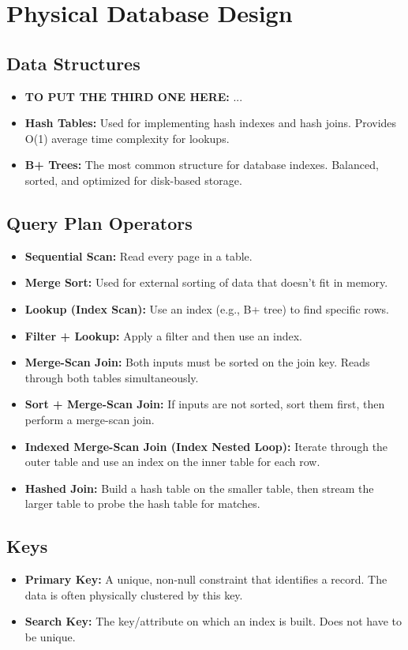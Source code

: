 
\section*{Physical Database Design}

\subsection*{Data Structures}
\begin{itemize}
    \item \textbf{TO PUT THE THIRD ONE HERE:} ...
    \item \textbf{Hash Tables:} Used for implementing hash indexes and hash joins. Provides O(1) average time complexity for lookups.
    \item \textbf{B+ Trees:} The most common structure for database indexes. Balanced, sorted, and optimized for disk-based storage.
\end{itemize}

\subsection*{Query Plan Operators}
\begin{itemize}
    \item \textbf{Sequential Scan:} Read every page in a table.
    \item \textbf{Merge Sort:} Used for external sorting of data that doesn't fit in memory.
    \item \textbf{Lookup (Index Scan):} Use an index (e.g., B+ tree) to find specific rows.
    \item \textbf{Filter + Lookup:} Apply a filter and then use an index.
    \item \textbf{Merge-Scan Join:} Both inputs must be sorted on the join key. Reads through both tables simultaneously.
    \item \textbf{Sort + Merge-Scan Join:} If inputs are not sorted, sort them first, then perform a merge-scan join.
    \item \textbf{Indexed Merge-Scan Join (Index Nested Loop):} Iterate through the outer table and use an index on the inner table for each row.
    \item \textbf{Hashed Join:} Build a hash table on the smaller table, then stream the larger table to probe the hash table for matches.
\end{itemize}

\subsection*{Keys}
\begin{itemize}
    \item \textbf{Primary Key:} A unique, non-null constraint that identifies a record. The data is often physically clustered by this key.
    \item \textbf{Search Key:} The key/attribute on which an index is built. Does not have to be unique.
\end{itemize}
